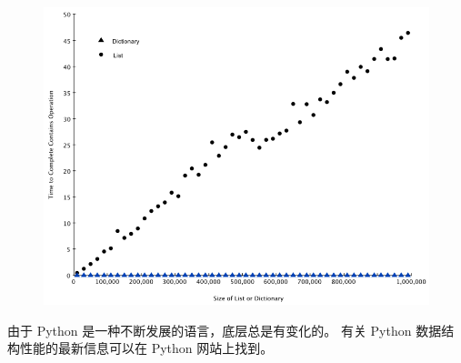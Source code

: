 \begin{figure}
        \centering
        \includegraphics[width=5in]{images/dict_figure.png}
\end{figure}
由于 Python 是一种不断发展的语言，底层总是有变化的。 有关 Python 数据结构性能的最新信息可以在 Python 网站上找到。  
